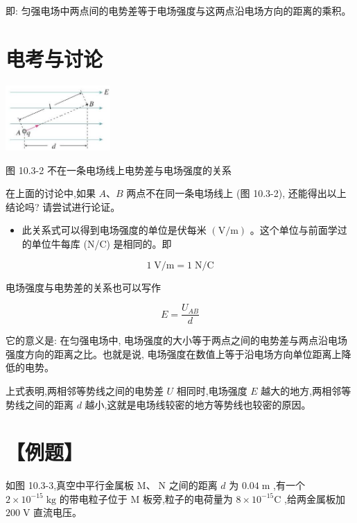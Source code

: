 \documentclass[10pt]{article}
\begin{document}
即: 匀强电场中两点间的电势差等于电场强度与这两点沿电场方向的距离的乘积。

\section*{电考与讨论}

\begin{center}
\includegraphics[max width=0.3\textwidth]{images/01911d5f-8e38-70c0-b5b8-2b399bd115b6_40_596237.jpg}
\end{center}

图 10.3-2 不在一条电场线上电势差与电场强度的关系

在上面的讨论中,如果 \(A\text{、}B\) 两点不在同一条电场线上 (图 10.3-2), 还能得出以上结论吗? 请尝试进行论证。

\begin{mdframed}

\begin{itemize}
\item 此关系式可以得到电场强度的单位是伏每米 \(\left( {\mathrm{V}/\mathrm{m}}\right)\) 。这个单位与前面学过的单位牛每库 (N/C) 是相同的。即
\end{itemize}

\[
1\mathrm{\;V}/\mathrm{m} = 1\mathrm{\;N}/\mathrm{C}
\]

\end{mdframed}

电场强度与电势差的关系也可以写作

\[
E = \frac{{U}_{AB}}{d}
\]

它的意义是: 在匀强电场中, 电场强度的大小等于两点之间的电势差与两点沿电场强度方向的距离之比。也就是说, 电场强度在数值上等于沿电场方向单位距离上降低的电势。

上式表明,两相邻等势线之间的电势差 \(U\) 相同时,电场强度 \(E\) 越大的地方,两相邻等势线之间的距离 \(d\) 越小,这就是电场线较密的地方等势线也较密的原因。

\section*{【例题】}

如图 10.3-3,真空中平行金属板 \(\mathrm{M}\text{、}\mathrm{\;N}\) 之间的距离 \(d\) 为 \({0.04}\mathrm{\;m}\) ,有一个 \(2 \times {10}^{-{15}}\mathrm{\;{kg}}\) 的带电粒子位于 \(\mathrm{M}\) 板旁,粒子的电荷量为 \(8 \times {10}^{-{15}}\mathrm{C}\) ,给两金属板加 \({200}\mathrm{\;V}\) 直流电压。
\end{document}

